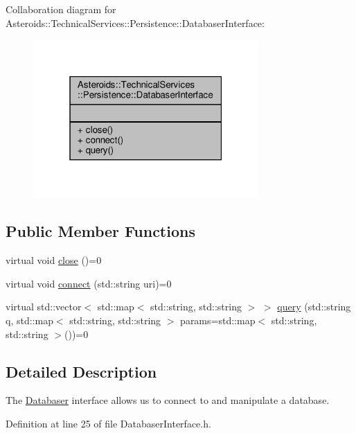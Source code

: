 Collaboration diagram for Asteroids\+:\+:Technical\+Services\+:\+:Persistence\+:\+:Databaser\+Interface\+:\nopagebreak
\begin{figure}[H]
\begin{center}
\leavevmode
\includegraphics[width=244pt]{classAsteroids_1_1TechnicalServices_1_1Persistence_1_1DatabaserInterface__coll__graph}
\end{center}
\end{figure}
\subsection*{Public Member Functions}
\begin{DoxyCompactItemize}
\item 
virtual void \hyperlink{classAsteroids_1_1TechnicalServices_1_1Persistence_1_1DatabaserInterface_a2c10f4a7500c8285924164334d133aae}{close} ()=0
\item 
virtual void \hyperlink{classAsteroids_1_1TechnicalServices_1_1Persistence_1_1DatabaserInterface_a5ad374ce9c8f0fc04b224a85417b4742}{connect} (std\+::string uri)=0
\item 
virtual std\+::vector$<$ std\+::map$<$ std\+::string, std\+::string $>$ $>$ \hyperlink{classAsteroids_1_1TechnicalServices_1_1Persistence_1_1DatabaserInterface_a8405defffe62181ae654b65bbe45d1c9}{query} (std\+::string q, std\+::map$<$ std\+::string, std\+::string $>$ params=std\+::map$<$ std\+::string, std\+::string $>$())=0
\end{DoxyCompactItemize}


\subsection{Detailed Description}
The \hyperlink{classAsteroids_1_1TechnicalServices_1_1Persistence_1_1Databaser}{Databaser} interface allows us to connect to and manipulate a database. 

Definition at line 25 of file Databaser\+Interface.\+h.



